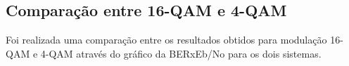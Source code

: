 \subsection{Comparação entre 16-QAM e 4-QAM}
Foi realizada uma comparação entre os resultados obtidos para modulação 16-QAM e 4-QAM através do gráfico da BERxEb/No para os dois sistemas.

